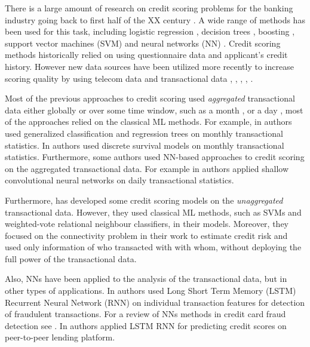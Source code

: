 \documentclass[sigconf]{acmart}
\begin{document}
There is a large amount of research on credit scoring problems for the banking industry going back to first half of the XX century \cite{NBERc12952}. A wide range of methods has been used for this task, including logistic regression \cite{RePEc:cup:jfinqa:v:15:y:1980:i:03:p:757-770_00}, decision trees \cite{makowski1985credit}, boosting \cite{bastos2007credit}, support vector machines (SVM) \cite{HUANG2007847} and neural networks (NN) \cite{west2000neural}. Credit scoring methods historically relied on using questionnaire data and applicant's credit history. However new data sources have been utilized more recently to increase scoring quality by using telecom data \cite{bjorkegren2017behavior} and transactional data \cite{khandani2010consumer}, \cite{bellotti2013forecasting}, \cite{KVAMME2018207}, \cite{chi2012hybrid}, \cite{RePEc}.

Most of the previous approaches to credit scoring used {\em aggregated} transactional data either globally \cite{chi2012hybrid} or over some time window, such as a month \cite{khandani2010consumer}, \cite{bellotti2013forecasting} or a day \cite{KVAMME2018207}, most of the approaches relied on the classical ML methods. For example, in \cite{khandani2010consumer} authors used generalized classification and regression trees on monthly transactional statistics. In \cite{bellotti2013forecasting} authors used discrete survival models on monthly transactional statistics. Furthermore, some authors used NN-based approaches to credit scoring on the aggregated transactional data. For example in \cite{KVAMME2018207} authors applied shallow convolutional neural networks on daily transactional statistics. 

Furthermore, \cite{RePEc} has developed some credit scoring models on the {\em unaggregated} transactional data. However, they used classical ML methods, such as SVMs and weighted-vote relational neighbour classifiers, in their models. Moreover, they focused on the connectivity problem in their work to estimate credit risk and used only information of who transacted with with whom, without deploying the full power of the transactional data.

Also, NNs have been applied to the analysis of the transactional data, but in other types of applications. In \cite{fraud_lstm} authors used Long Short Term Memory (LSTM) Recurrent Neural Network (RNN) \cite{gers1999learning} on individual transaction features for detection of fraudulent transactions. For a review of NNs methods in credit card fraud detection see \cite{abdallah2016fraud}. In \cite{zhang2017credit}  authors applied LSTM RNN for predicting credit scores on peer-to-peer lending platform.
\end{document}
